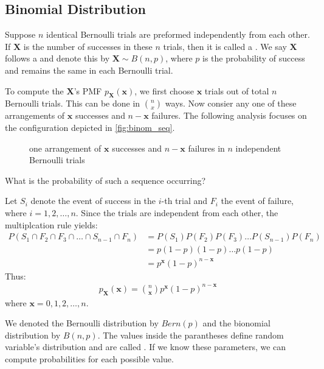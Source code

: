 \subsection{Binomial Distribution}

Suppose \( n \) identical Bernoulli trials are preformed independently from each other.
If \( \bm{X} \) is the number of successes in these \( n \) trials, then it is called a .
We say \( \bm{X} \) follows a  and denote this by \( \bm{X} \sim B(n, p) \),
where \( p \) is the probability of success and remains the same in each Bernoulli trial.

To compute the \( \bm{X} \)'s PMF \( p_{\bm{X}}(\bm{x}) \),
we first choose \( \bm{x} \) trials out of total \( n \) Bernoulli trials.
This can be done in \( n \choose x \) ways.
Now consier any one of these arrangements of \( \bm{x} \) successes and \( n - \bm{x} \) failures.
The following analysis focuses on the configuration depicted in \autoref{fig:binom_seq}.
\begin{figure}[t]
\begin{center}
\end{center}
\caption{one arrangement of \( \bm{x} \) successes and \( n - \bm{x} \) failures in \( n \) independent Bernoulli trials}
\label{fig:binom_seq}
\end{figure}
What is the probability of such a sequence occurring?

Let \( S_i \) denote the event of success in the \( i \)-th trial and \( F_i \) the event of failure, where \( i = 1, 2, \ldots, n \).
Since the trials are independent from each other, the multiplcation rule yields:
\begin{align*}
    P(S_1 \cap F_2 \cap F_3 \cap \ldots \cap S_{n - 1} \cap F_{n}) &= P(S_1)P(F_2)P(F_3)\ldots P(S_{n - 1})P(F_n)\\
    &= p(1 - p)(1 - p)\ldots p(1 - p)\\
    &= p^{\bm{x}}(1 - p)^{n - \bm{x}}
\end{align*}
Thus:
\begin{gather*}
    p_{\bm{X}}(\bm{x}) = \binom{n}{\bm{x}} p^{\bm{x}}(1 - p)^{n - \bm{x}}
\end{gather*}
where \( \bm{x} = 0, 1, 2, \ldots, n \).

We denoted the Bernoulli distribution by \( Bern(p) \) and the bionomial distribution by \( B(n, p) \).
The values inside the parantheses define random variable's distribution and are called .
If we know these parameters, we can compute probabilities for each possible value.

